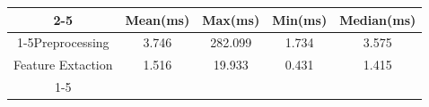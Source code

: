 \documentclass{standalone}
\begin{document}
 
 \begin{tabular}{|c |c |c |c |c |}
\cline{2-5}\cline{2-5} \multicolumn{1}{c |}{ } & Mean(ms) & Max(ms) & Min(ms) & Median(ms)\\ 
\cline{1-5}Preprocessing & 3.746 & 282.099 & 1.734 & 3.575\\ 
 \hhline{|=|=|=|=|=|}Feature Extaction & 1.516 & 19.933 & 0.431 & 1.415\\ 
 \cline{1-5}\hline \end{tabular}
 
\end{document}
